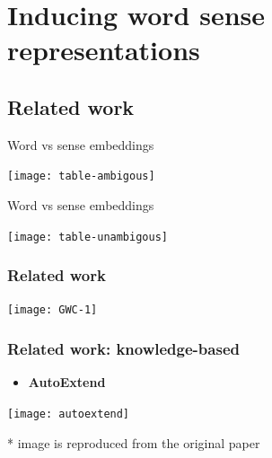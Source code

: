 
\section{Inducing word sense representations}


\subsection{Related work}

\begin{frame}{Word vs sense embeddings}

\begin{center}
	\texttt{[image: table-ambigous]}
\end{center}	
\end{frame}

\begin{frame}{Word vs sense embeddings}

\begin{center}
	\texttt{[image: table-unambigous]}
\end{center}	
\end{frame}


\begin{frame}[fragile]
\frametitle{Related work}
\begin{center}
 \texttt{[image: GWC-1]}
 \end{center}
\end{frame}


\begin{frame}
\frametitle{Related work: knowledge-based}
\begin{itemize}
	\item \textbf{AutoExtend}~\cite{rothe-schutze:2015:ACL-IJCNLP}
\end{itemize}
\begin{center}
 \texttt{[image: autoextend]}
 \end{center}

{\footnotesize
 * image is reproduced from the original paper
}

\end{frame}

